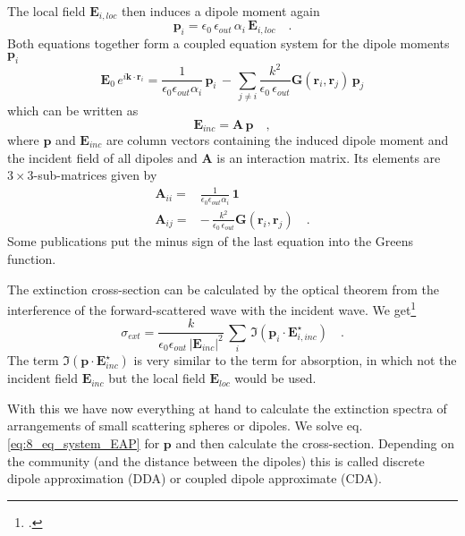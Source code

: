 The local field $\mathbf{E}_{i, loc}$ then induces a dipole moment again 
\begin{equation}
\mathbf{p}_i = \epsilon_0 \, \epsilon_{out} \, \alpha_i \, \mathbf{E}_{i,loc} \quad .
\end{equation}
Both equations together form a coupled equation system for the 
 dipole moments $ \mathbf{p}_i$
\begin{equation}
\mathbf{E}_{0} \, e^{i \mathbf{k} \cdot \mathbf{r}_i} =
\frac{1}{\epsilon_0 \epsilon_{out} \alpha_i} \, \mathbf{p}_i 
 \,  - \, 
 \sum_{j \neq i} \frac{k^2}{\epsilon_0 \, \epsilon_{out}} 
 \mathbf{G}(\mathbf{r}_i, \mathbf{r}_j)  \, \mathbf{p}_j 
\end{equation} 
 which can be written as
 \begin{equation}
 \mathbf{E}_{inc} = \mathbf{A} \, \mathbf{p} \quad , \label{eq:8_eq_system_EAP}
 \end{equation}
where $\mathbf{p}$ and $ \mathbf{E}_{inc} $ are column vectors containing the induced dipole moment and the incident field of all dipoles and $\mathbf{A} $ is an interaction matrix. Its elements are $3 \times 3$-sub-matrices given by
 \begin{align}
 \mathbf{A}_{ii} = &\frac{1}{\epsilon_0 \epsilon_{out} \alpha_i} \, \mathbf{1} \\
 \mathbf{A}_{ij} = & - \, 
 \frac{k^2}{\epsilon_0 \, \epsilon_{out}} 
 \mathbf{G}(\mathbf{r}_i, \mathbf{r}_j)  \quad .
 \end{align}
Some publications put the minus sign of the last equation into the Greens function. 


The extinction cross-section can be calculated by the optical theorem from the interference of the forward-scattered wave with the incident wave. We get\footcite{Draine88,Yurkin07}
\begin{equation}
\sigma_{ext} = \frac{k}{\epsilon_0 \epsilon_{out}  \, |\mathbf{E}_{inc}|^2} \, \sum_i \, \Im ( \mathbf{p}_i \cdot \mathbf{E}_{i, inc}^\star ) \quad .
\end{equation}
The term $\Im ( \mathbf{p} \cdot \mathbf{E}_{inc}^\star )$ is very similar to the term for absorption, in which not the incident field $\mathbf{E}_{inc} $ but the local field $\mathbf{E}_{loc} $ would be used.

 

 
With this we have now everything at hand to calculate the  extinction spectra of arrangements  of small scattering spheres or dipoles. We solve eq. \ref{eq:8_eq_system_EAP} for $\mathbf{p}$ and then calculate the cross-section. Depending on the community (and the distance between the dipoles) this is called discrete dipole approximation (DDA) or coupled dipole approximate (CDA).
 
